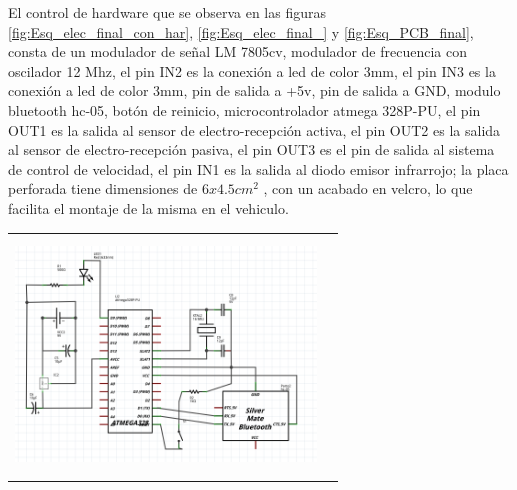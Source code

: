 \documentclass[12]{article}
\newenvironment{Figure}
{\par\medskip\noindent\minipage{\linewidth}}
{\endminipage\par\medskip}
\begin{document}
\begin{multicols}{2}
\begin{Figure}
\begin{tabular}{|l|r|}
\end{tabular}
\label{fig:Esq_elec_final_con_har}
\end{Figure}
\vspace{1cm}
El control de hardware que se observa en las figuras \ref{fig:Esq_elec_final_con_har}, \ref{fig:Esq_elec_final_} y \ref{fig:Esq_PCB_final}, consta de un modulador de señal LM 7805cv, modulador de frecuencia con oscilador 12 Mhz, el pin IN2 es la conexión a led de color 3mm,  el pin IN3 es la conexión a led de color 3mm, pin de salida a +5v, pin de salida a GND, modulo bluetooth hc-05, botón de reinicio, microcontrolador atmega 328P-PU, el pin OUT1 es la salida al sensor de electro-recepción activa, el pin OUT2 es la salida al sensor de electro-recepción pasiva, el pin OUT3 es el pin de salida al sistema de control de velocidad, el pin IN1 es la salida al diodo emisor infrarrojo; la placa perforada tiene dimensiones de  $6x4.5 cm^{2}$ , con un acabado en velcro, lo que facilita el montaje de la misma en el vehiculo.
\begin{Figure}
\center
\begin{tabular}{|l|r|}
\hline
\\
\includegraphics[width=8cm, height=6cm]{img/G4.png}  \\\\ \hline
\end{tabular}
\label{fig:Esq_elec_final_}
\end{Figure}

\end{multicols}
\end{document}
